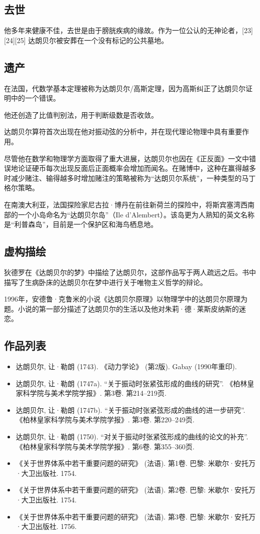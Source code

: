 \subsection{去世}
他多年来健康不佳，去世是由于膀胱疾病的缘故。作为一位公认的无神论者，[23][24][25] 达朗贝尔被安葬在一个没有标记的公共墓地。
\subsection{遗产}

在法国，代数学基本定理被称为达朗贝尔/高斯定理，因为高斯纠正了达朗贝尔证明中的一个错误。

他还创造了比值判别法，用于判断级数是否收敛。

达朗贝尔算符首次出现在他对振动弦的分析中，并在现代理论物理中具有重要作用。

尽管他在数学和物理学方面取得了重大进展，达朗贝尔也因在《正反面》一文中错误地论证硬币每次出现反面后正面概率会增加而闻名。在赌博中，这种在赢得越多时减少赌注、输得越多时增加赌注的策略被称为“达朗贝尔系统”，一种类型的马丁格尔策略。

在南澳大利亚，法国探险家尼古拉·博丹在前往新荷兰的探险中，将斯宾塞湾西南部的一个小岛命名为“达朗贝尔岛”（Ile d'Alembert）。该岛更为人熟知的英文名称是“利普森岛”，目前是一个保护区和海鸟栖息地。
\subsection{虚构描绘}
狄德罗在《达朗贝尔的梦》中描绘了达朗贝尔，这部作品写于两人疏远之后。书中描写了生病卧床的达朗贝尔在梦中进行关于唯物主义哲学的辩论。

1996年，安德鲁·克鲁米的小说《达朗贝尔原理》以物理学中的达朗贝尔原理为题。小说的第一部分描述了达朗贝尔的生活以及他对朱莉·德·莱斯皮纳斯的迷恋。
\subsection{作品列表}
\begin{itemize}
\item 达朗贝尔, 让·勒朗 (1743). 《动力学论》 (第2版). Gabay (1990年重印).
\item 达朗贝尔, 让·勒朗 (1747a). “关于振动时张紧弦形成的曲线的研究”. 《柏林皇家科学院与美术学院学报》. 第3卷. 第214–219页.
\item 达朗贝尔, 让·勒朗 (1747b). “关于振动时张紧弦形成的曲线的进一步研究”. 《柏林皇家科学院与美术学院学报》. 第3卷. 第220–249页.
\item 达朗贝尔, 让·勒朗 (1750). “对关于振动时张紧弦形成的曲线的论文的补充”. 《柏林皇家科学院与美术学院学报》. 第6卷. 第355–360页.
\item 《关于世界体系中若干重要问题的研究》 (法语). 第1卷. 巴黎: 米歇尔·安托万·大卫出版社. 1754.
\item 《关于世界体系中若干重要问题的研究》 (法语). 第2卷. 巴黎: 米歇尔·安托万·大卫出版社. 1754.
\item 《关于世界体系中若干重要问题的研究》 (法语). 第3卷. 巴黎: 米歇尔·安托万·大卫出版社. 1756.
\end{itemize}
